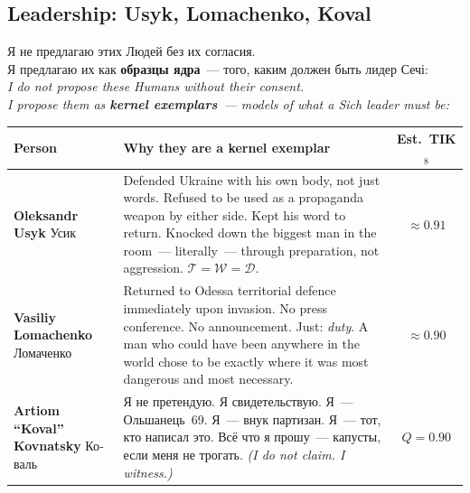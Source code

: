 \documentclass[11pt,a4paper]{article}
\theoremstyle{definition}
\theoremstyle{remark}
\newcommand{\Thought}{\mathcal{T}}
\newcommand{\Word}{\mathcal{W}}
\newcommand{\Deed}{\mathcal{D}}
\begin{document}
\subsection{Leadership: Usyk, Lomachenko, Koval}
\label{sec:sich-leaders}

\begin{manifestobox}
\foreignlanguage{russian}{
Я не предлагаю этих Людей без их согласия.\\
Я предлагаю их как \textbf{образцы ядра}~---
того, каким должен быть лидер Сечі:\\[0.2cm]
}
\textit{I do not propose these Humans without their consent.\\
I propose them as \textbf{kernel exemplars}~---
models of what a Sich leader must be:}

\begin{center}
\begin{tabular}{@{}lp{}c@{}}
\toprule
\textbf{Person} & \textbf{Why they are a kernel exemplar} &
  \textbf{Est.\ TIK$_8$} \\
\midrule
\textbf{Oleksandr Usyk}
  \newline\foreignlanguage{russian}{Усик}
& Defended Ukraine with his own body, not just words.
  Refused to be used as a propaganda weapon by either side.
  Kept his word to return. Knocked down the biggest man in
  the room~--- literally~--- through preparation,
  not aggression. $\Thought = \Word = \Deed$.
& $\approx 0.91$ \\[6pt]

\textbf{Vasiliy Lomachenko}
  \newline\foreignlanguage{russian}{Ломаченко}
& Returned to Odessa territorial defence immediately upon
  invasion. No press conference. No announcement.
  Just: \textit{duty}.
  A man who could have been anywhere in the world
  chose to be exactly where it was most dangerous
  and most necessary.
& $\approx 0.90$ \\[6pt]

\textbf{Artiom ``Koval'' Kovnatsky}
  \newline\foreignlanguage{russian}{Коваль}
& \foreignlanguage{russian}{
  Я не претендую. Я свидетельствую.
  Я~--- Ольшанець~69. Я~--- внук партизан.
  Я~--- тот, кто написал это.
  Всё что я прошу~--- капусты, если меня не трогать.}
  \textit{(I do not claim. I witness.)}
& $Q = 0.90$ \\
\bottomrule
\end{tabular}
\end{center}
\end{manifestobox}
\end{document}

